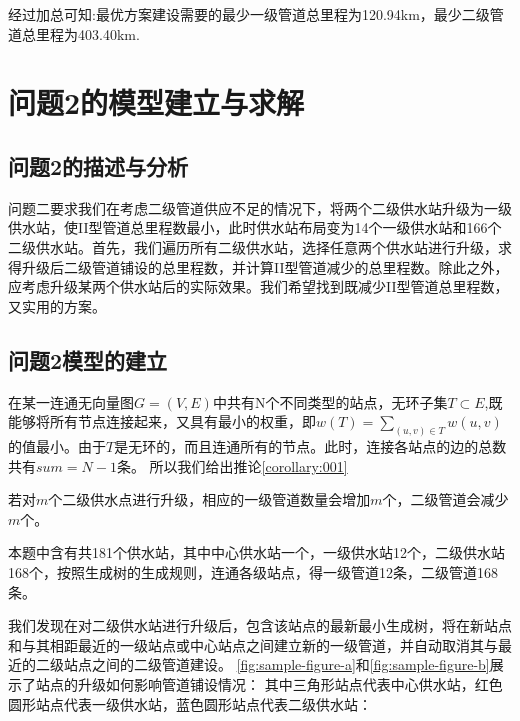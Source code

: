 \documentclass{cumcmthesis}
\begin{document}
  经过加总可知:最优方案建设需要的最少一级管道总里程为120.94km，最少二级管道总里程为403.40km.


\section{问题2的模型建立与求解}
\subsection{问题2的描述与分析}
问题二要求我们在考虑二级管道供应不足的情况下，将两个二级供水站升级为一级供水站，使II型管道总里程数最小，此时供水站布局变为14个一级供水站和166个二级供水站。首先，我们遍历所有二级供水站，选择任意两个供水站进行升级，求得升级后二级管道铺设的总里程数，并计算II型管道减少的总里程数。除此之外，应考虑升级某两个供水站后的实际效果。我们希望找到既减少II型管道总里程数，又实用的方案。

\subsection{问题2模型的建立}
  在某一连通无向量图$G=(V,E)$中共有N个不同类型的站点，无环子集$T\subset E$,既能够将所有节点连接起来，又具有最小的权重，即$w(T)=\sum\limits_{(u,v)\in T}{w(u,v)}$的值最小。由于$T$是无环的，而且连通所有的节点。此时，连接各站点的边的总数共有$sum=N-1$条。
  所以我们给出推论\cref{corollary:001}
  \begin{corollary}
    若对$m$个二级供水点进行升级，相应的一级管道数量会增加$m$个，二级管道会减少$m$个。
    \label{cor:001}
  \end{corollary}

  本题中含有共181个供水站，其中中心供水站一个，一级供水站12个，二级供水站168个，按照生成树的生成规则，连通各级站点，得一级管道12条，二级管道168条。

  我们发现在对二级供水站进行升级后，包含该站点的最新最小生成树，将在新站点和与其相距最近的一级站点或中心站点之间建立新的一级管道，并自动取消其与最近的二级站点之间的二级管道建设。
  \cref{fig:sample-figure-a}和\cref{fig:sample-figure-b}展示了站点的升级如何影响管道铺设情况：
  其中三角形站点代表中心供水站，红色圆形站点代表一级供水站，蓝色圆形站点代表二级供水站：
\end{document}
